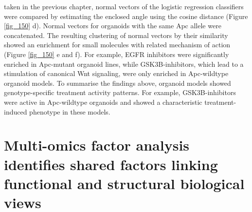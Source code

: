 \begin{flushleft}
taken in the previous chapter, normal vectors of the logistic regression classifiers were compared by estimating the enclosed angle using the cosine distance (Figure \ref{fig_150} d). Normal vectors for organoids with the same Apc allele were concatenated. The resulting clustering of normal vectors by their similarity showed an enrichment for small molecules with related mechanism of action (Figure \ref{fig_150} e and f). For example, EGFR inhibitors were significantly enriched in Apc-mutant organoid lines, while GSK3B-inhibitors, which lead to a stimulation of canonical Wnt signaling, were only enriched in Apc-wildtype organoid models. To summarise the findings above, organoid models showed genotype-specific treatment activity patterns. For example, GSK3B-inhibitors were active in Apc-wildtype organoids and showed a characteristic treatment-induced phenotype in these models.

\section{Multi-omics factor analysis identifies shared factors linking functional and structural biological views}


\end{flushleft}
